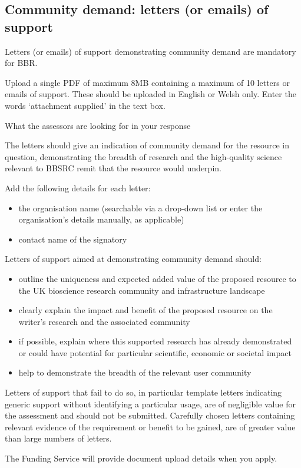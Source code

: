 \documentclass[11pt]{article}
\newenvironment{instruction}{%
    \begin{tcolorbox}[breakable,colback=red!5,colframe=red,title=Instruction]%
	}{%
    	\end{tcolorbox}%
	}
\begin{document}
\pagebreak
\subsection{Community demand: letters (or emails) of support}

\begin{instruction}
Letters (or emails) of support demonstrating community demand are mandatory
for BBR.

Upload a single PDF of maximum 8MB containing a maximum of 10 letters or
emails of support. These should be uploaded in English or Welsh only. Enter
the words ‘attachment supplied’ in the text box.

What the assessors are looking for in your response

The letters should give an indication of community demand for the resource in
question, demonstrating the breadth of research and the high-quality science
relevant to BBSRC remit that the resource would underpin.

Add the following details for each letter:

\begin{itemize}

	\item the organisation name (searchable via a drop-down list or enter the
organisation’s details manually, as applicable)

	\item contact name of the signatory

\end{itemize}

Letters of support aimed at demonstrating community demand should:

\begin{itemize}

	\item outline the uniqueness and expected added value of the proposed
resource to the UK bioscience research community and infrastructure landscape

	\item clearly explain the impact and benefit of the proposed resource on
the writer’s research and the associated community

	\item if possible, explain where this supported research has already
demonstrated or could have potential for particular scientific, economic or
societal impact

	\item help to demonstrate the breadth of the relevant user community

\end{itemize}

Letters of support that fail to do so, in particular template letters
indicating generic support without identifying a particular usage, are of
negligible value for the assessment and should not be submitted. Carefully
chosen letters containing relevant evidence of the requirement or benefit to be
gained, are of greater value than large numbers of letters.

The Funding Service will provide document upload details when you apply.

\end{instruction}
\end{document}
